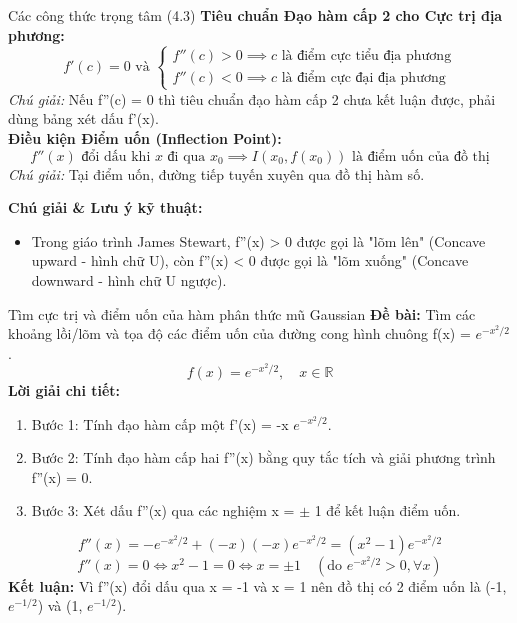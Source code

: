 \documentclass[11pt,a4paper,oneside]{book}
\begin{document}
\begin{congthuc}{Các công thức trọng tâm (4.3)}
\noindent\textbf{Tiêu chuẩn Đạo hàm cấp 2 cho Cực trị địa phương:}
\[ f'(c) = 0 \text{ và } \begin{cases} f''(c) > 0 \implies c \text{ là điểm cực tiểu địa phương} \\ f''(c) < 0 \implies c \text{ là điểm cực đại địa phương} \end{cases} \]
\noindent\textit{Chú giải:} Nếu f''(c) = 0 thì tiêu chuẩn đạo hàm cấp 2 chưa kết luận được, phải dùng bảng xét dấu f'(x).\\[4pt]
\noindent\textbf{Điều kiện Điểm uốn (Inflection Point):}
\[ f''(x) \text{ đổi dấu khi } x \text{ đi qua } x_0 \implies I(x_0, f(x_0)) \text{ là điểm uốn của đồ thị} \]
\noindent\textit{Chú giải:} Tại điểm uốn, đường tiếp tuyến xuyên qua đồ thị hàm số.\\[4pt]
\end{congthuc}

\noindent\textbf{Chú giải \& Lưu ý kỹ thuật:}
\begin{itemize}[leftmargin=1.5em, itemsep=2pt]
  \item Trong giáo trình James Stewart, f''(x) > 0 được gọi là "lõm lên" (Concave upward - hình chữ U), còn f''(x) < 0 được gọi là "lõm xuống" (Concave downward - hình chữ U ngược).
\end{itemize}

\begin{vidu}{Tìm cực trị và điểm uốn của hàm phân thức mũ Gaussian}
\textbf{Đề bài:} Tìm các khoảng lồi/lõm và tọa độ các điểm uốn của đường cong hình chuông f(x) = $e^{-x^2/2}$.
\[ f(x) = e^{-x^2/2}, \quad x \in \mathbb{R} \]
\textbf{Lời giải chi tiết:}
\begin{enumerate}[leftmargin=1.5em, itemsep=2pt]
  \item Bước 1: Tính đạo hàm cấp một f'(x) = -x $e^{-x^2/2}$.
  \item Bước 2: Tính đạo hàm cấp hai f''(x) bằng quy tắc tích và giải phương trình f''(x) = 0.
  \item Bước 3: Xét dấu f''(x) qua các nghiệm x = $\pm$ 1 để kết luận điểm uốn.
\end{enumerate}
\[ f''(x) = -e^{-x^2/2} + (-x)(-x)e^{-x^2/2} = (x^2 - 1)e^{-x^2/2} \]
\[ f''(x) = 0 \iff x^2 - 1 = 0 \iff x = \pm 1 \quad (\text{do } e^{-x^2/2} > 0, \forall x) \]
\noindent\textbf{Kết luận:} Vì f''(x) đổi dấu qua x = -1 và x = 1 nên đồ thị có 2 điểm uốn là (-1, $e^{-1/2}$) và (1, $e^{-1/2}$).
\end{vidu}
\end{document}

